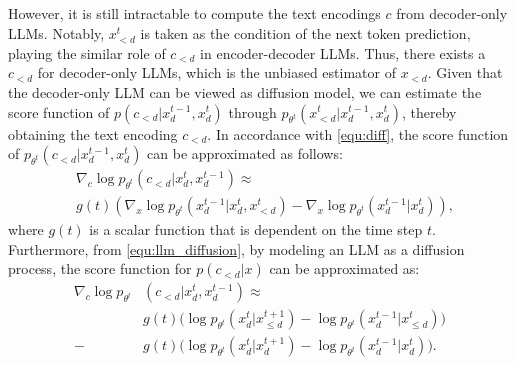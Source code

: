 However, it is still intractable to compute the text encodings $c$ from decoder-only LLMs. Notably, $x_{<d}^t$ is taken as the condition of the next token prediction, playing the similar role of $c_{<d}$ in encoder-decoder LLMs. Thus, there exists a $c_{<d}$ for decoder-only LLMs, which is the unbiased estimator of $x_{<d}$. Given that the decoder-only LLM can be viewed as diffusion model, we can estimate the score function of $p(c_{<d}|x^{t-1}_d, x^t_d)$ through $p_{\theta^t}(x^t_{<d}|x^{t-1}_d, x^t_d)$, thereby obtaining the text encoding $c_{<d}$. 
In accordance with \cref{equ:diff}, the score function of \( p_{\theta^t}(c_{<d}|x^{t-1}_d, x^t_d) \) can be approximated as follows:
\begin{equation}
\label{equ:score}
\begin{aligned}
&\nabla_c \log p_{\theta^t}(c_{<d}|x^t_{d}, x^{t-1}_{d}) \approx \\ &g(t)(\nabla_x \log p_{\theta^t}(x^{t-1}_d|x^t_d, x^t_{<d}) - \nabla_x \log p_{\theta^t}(x^{t-1}_d|x^t_d)),
\end{aligned}
\end{equation}
where $g(t)$ is a scalar function that is dependent on the time step $t$. 
Furthermore, from \cref{equ:llm_diffusion}, by modeling an LLM as a diffusion process, the score function for $p(c_{<d}|x)$ can be approximated as:
\begin{equation}
\label{equ:score_diff}
\begin{aligned}
\nabla_c \log p_{\theta^t} &(c_{<d}|x^t_{d}, x^{t-1}_{d}) \approx \\ & g(t)\bigl(\log p_{\theta^t}(x^t_d|x^{t+1}_{\leq d}) - \log p_{\theta^t}(x^{t-1}_d|x^t_{\leq d})\bigr) \\ -& g(t)\bigl(\log p_{\theta^t}(x^t_d|x^{t+1}_d) - \log p_{\theta^t}(x^{t-1}_d|x^t_d)\bigr).
\end{aligned}
\end{equation}




